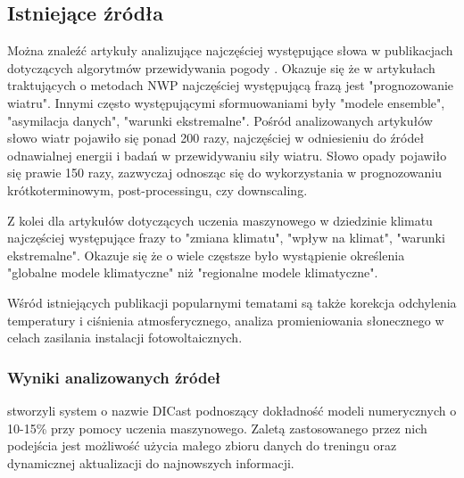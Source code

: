 \subsection{Istniejące źródła}

Można znaleźć artykuły analizujące najczęściej występujące słowa
w publikacjach dotyczących algorytmów przewidywania pogody 
\cite{ml-in-weather-prediction}. Okazuje się że w artykułach traktujących o
metodach NWP najczęściej występującą frazą jest "prognozowanie wiatru". Innymi 
często występującymi sformuowaniami były "modele ensemble", "asymilacja danych",
"warunki ekstremalne". Pośród analizowanych artykułów słowo wiatr pojawiło się
ponad 200 razy, najczęściej w odniesieniu do źródeł odnawialnej energii i badań
w przewidywaniu siły wiatru. Słowo opady pojawiło się prawie 150 razy, zazwyczaj
odnosząc się do wykorzystania w prognozowaniu krótkoterminowym, post-processingu, czy
downscaling. 

Z kolei dla artykułów dotyczących uczenia maszynowego
w dziedzinie klimatu najczęściej występujące frazy to "zmiana klimatu", 
"wpływ na klimat", "warunki ekstremalne". Okazuje się że o wiele częstsze było
wystąpienie określenia "globalne modele klimatyczne" niż "regionalne modele 
klimatyczne". 

Wśród istniejących publikacji popularnymi tematami są także korekcja odchylenia 
temperatury i ciśnienia atmosferycznego, analiza promieniowania słonecznego w celach
zasilania instalacji fotowoltaicznych.

\subsubsection*{Wyniki analizowanych źródeł}

\cite{machine-learning-for-applied-weather-prediction} stworzyli system 
o nazwie DICast podnoszący dokładność modeli numerycznych o 10-15\% przy pomocy
uczenia maszynowego. Zaletą zastosowanego przez nich podejścia jest możliwość
użycia małego zbioru danych do treningu oraz dynamicznej aktualizacji do 
najnowszych informacji.

